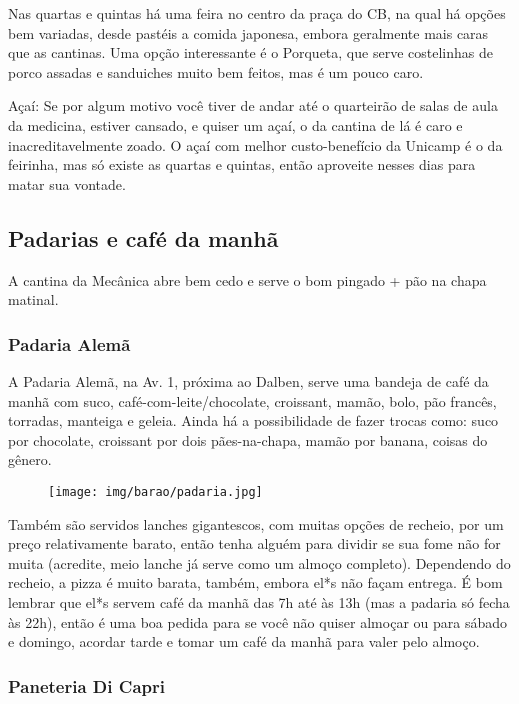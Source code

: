 Nas quartas e quintas há uma feira no centro da praça do CB, na qual há opções bem
variadas, desde pastéis a comida japonesa, embora geralmente mais caras que as
cantinas. Uma opção interessante é o Porqueta, que serve costelinhas de porco
assadas e sanduiches muito bem feitos, mas é um pouco caro.

Açaí: Se por algum motivo você tiver de andar até o quarteirão de salas de aula
da medicina, estiver cansado, e quiser um açaí, o da cantina de lá é caro e
inacreditavelmente zoado. O açaí com melhor custo-benefício da Unicamp é o da
feirinha, mas só existe as quartas e quintas, então aproveite nesses dias para
matar sua vontade.


\subsection{Padarias e café da manhã}

A cantina da Mecânica abre bem cedo e serve o bom pingado + pão na chapa
matinal.

\subsubsection{Padaria Alemã}

A Padaria Alemã, na Av. 1, próxima ao Dalben, serve uma bandeja de café da manhã
com suco, café-com-leite/chocolate, croissant, mamão, bolo, pão francês,
torradas, manteiga e geleia. Ainda há a possibilidade de fazer trocas como: suco
por chocolate, croissant por dois pães-na-chapa, mamão por banana, coisas do
gênero.
\begin{figure}[h!]
    \centering
    \texttt{[image: img/barao/padaria.jpg]}
\end{figure}

Também são servidos lanches gigantescos, com muitas opções de recheio, por um
preço relativamente barato, então tenha alguém para dividir se sua fome não for
muita (acredite, meio lanche já serve como um almoço completo). Dependendo do
recheio, a pizza é muito barata, também, embora el*s não façam entrega. É bom
lembrar que el*s servem café da manhã das 7h até às 13h (mas a padaria só fecha
às 22h), então é uma boa pedida para se você não quiser almoçar ou para sábado e
domingo, acordar tarde e tomar um café da manhã para valer pelo almoço.

\subsubsection{Paneteria Di Capri}

